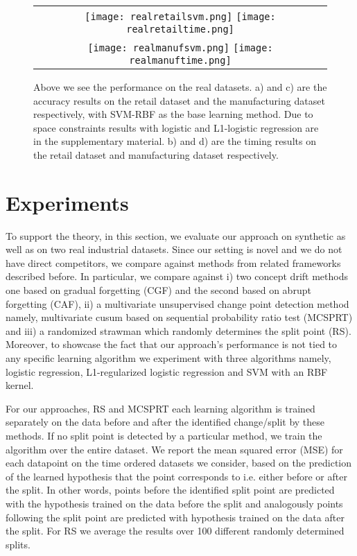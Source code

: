 \documentclass{article}
\begin{document}
\begin{figure*}[t]
   \begin{tabular}{c}
      \texttt{[image: realretailsvm.png]}
     \texttt{[image: realretailtime.png]}\\
\texttt{[image: realmanufsvm.png]}
\texttt{[image: realmanuftime.png]}
     \end{tabular}
    \caption{Above we see the performance on the real datasets. a) and c) are the accuracy results on the retail dataset and the manufacturing dataset respectively, with SVM-RBF as the base learning method. Due to space constraints results with logistic and L1-logistic regression are in the supplementary material. b) and d) are the timing results on the retail dataset and manufacturing dataset respectively.}
\label{real}
\end{figure*}

\section{Experiments}
\label{sec:exp}

To support the theory, in this section, we evaluate our approach on synthetic as well as on two real industrial datasets. Since our setting is novel and we do not have direct competitors, we compare against methods from related frameworks described before. In particular, we compare against i) two concept drift methods one based on gradual forgetting (CGF) and the second based on abrupt forgetting (CAF)\cite{cdSurvey}, ii) a multivariate unsupervised change point detection method namely, multivariate cusum based on sequential probability ratio test (MCSPRT) and iii) a randomized strawman which randomly determines the split point (RS). Moreover, to showcase the fact that our approach's performance is not tied to any specific learning algorithm we experiment with three algorithms namely, logistic regression, L1-regularized logistic regression and SVM with an RBF kernel. 

For our approaches, RS and MCSPRT each learning algorithm is trained separately on the data before and after the identified change/split by these methods. If no split point is detected by a particular method, we train the algorithm over the entire dataset. We report the mean squared error (MSE) for each datapoint on the time ordered datasets we consider, based on the prediction of the learned hypothesis that the point corresponds to i.e. either before or after the split. In other words, points before the identified split point are predicted with the hypothesis trained on the data before the split and analogously points following the split point are predicted with hypothesis trained on the data after the split. For RS we average the results over 100 different randomly determined splits.
\end{document}
